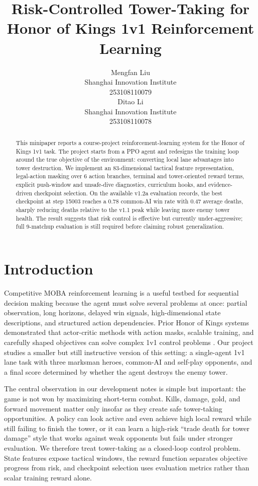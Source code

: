 \documentclass{article}
\title{Risk-Controlled Tower-Taking for Honor of Kings 1v1 Reinforcement Learning}
\author{%
  Mengfan Liu\\
  Shanghai Innovation Institute\\
  253108110079\\
  \And
  Ditao Li\\
  Shanghai Innovation Institute\\
  253108110078\\
}
\begin{document}
\maketitle

\begin{abstract}
This minipaper reports a course-project reinforcement-learning system for the Honor of Kings 1v1 task. The project starts from a PPO agent and redesigns the training loop around the true objective of the environment: converting local lane advantages into tower destruction. We implement an 83-dimensional tactical feature representation, legal-action masking over 6 action branches, terminal and tower-oriented reward terms, explicit push-window and unsafe-dive diagnostics, curriculum hooks, and evidence-driven checkpoint selection. On the available v1.2a evaluation records, the best checkpoint at step 15003 reaches a 0.78 common-AI win rate with 0.47 average deaths, sharply reducing deaths relative to the v1.1 peak while leaving more enemy tower health. The result suggests that risk control is effective but currently under-aggressive; full 9-matchup evaluation is still required before claiming robust generalization.
\end{abstract}

\section{Introduction}

Competitive MOBA reinforcement learning is a useful testbed for sequential decision making because the agent must solve several problems at once: partial observation, long horizons, delayed win signals, high-dimensional state descriptions, and structured action dependencies. Prior Honor of Kings systems demonstrated that actor-critic methods with action masks, scalable training, and carefully shaped objectives can solve complex 1v1 control problems \citep{ye2020moba,wei2022hokarena}. Our project studies a smaller but still instructive version of this setting: a single-agent 1v1 lane task with three marksman heroes, common-AI and self-play opponents, and a final score determined by whether the agent destroys the enemy tower.

The central observation in our development notes is simple but important: the game is not won by maximizing short-term combat. Kills, damage, gold, and forward movement matter only insofar as they create safe tower-taking opportunities. A policy can look active and even achieve high local reward while still failing to finish the tower, or it can learn a high-risk ``trade death for tower damage'' style that works against weak opponents but fails under stronger evaluation. We therefore treat tower-taking as a closed-loop control problem. State features expose tactical windows, the reward function separates objective progress from risk, and checkpoint selection uses evaluation metrics rather than scalar training reward alone.
\end{document}
